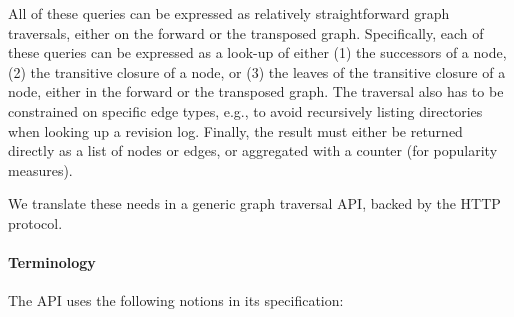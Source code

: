 All of these queries can be expressed as relatively straightforward graph
traversals, either on the forward or the transposed graph. Specifically, each
of these queries can be expressed as a look-up of either (1) the successors of
a node, (2) the transitive closure of a node, or (3) the leaves of the
transitive closure of a node, either in the forward or the transposed graph.
The traversal also has to be constrained on specific edge types, e.g., to avoid
recursively listing directories when looking up a revision log. Finally, the
result must either be returned directly as a list of nodes or edges, or
aggregated with a counter (for popularity measures).

We translate these needs in a generic graph traversal API, backed by the HTTP
protocol.

\paragraph*{Terminology}
The API uses the following notions in its specification:

